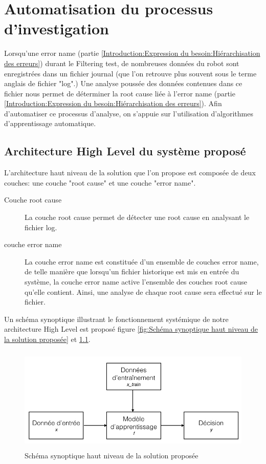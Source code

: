 \chapter{Automatisation du processus d'investigation}
\label{Automatisation du processus d'investigation}
\thispagestyle{fancy}
Lorsqu'une error name (partie \ref{Introduction:Expression du besoin:Hiérarchisation des erreurs}) durant le Filtering test, de nombreuses données du robot sont enregistrées dans un fichier journal (que l'on retrouve plus souvent sous le terme anglais de fichier "log".) Une analyse poussée des données contenues dans ce fichier nous permet de déterminer la root cause liée à l'error name (partie \ref{Introduction:Expression du besoin:Hiérarchisation des erreurs}). Afin d'automatiser ce processus d'analyse, on s'appuie sur l'utilisation d'algorithmes d'apprentissage automatique. 

\section{Architecture High Level du système proposé}
\label{Automatisation du processus d'investigation: Achitecture High Level du système proposé}
L'architecture haut niveau de la solution que l'on propose est composée de deux couches: une couche "root cause" et une couche "error name".
\begin{description}
	\item [Couche root cause] La couche root cause permet de détecter une root cause en analysant le fichier log.
	\item [couche error name] La couche error name est constituée d'un ensemble de couches error name, de telle manière que lorsqu'un fichier historique est mis en entrée du système, la couche error name active l'ensemble des couches root cause qu'elle contient. Ainsi, une analyse de chaque root cause sera effectué sur le fichier.
\end{description} 

Un schéma synoptique illustrant le fonctionnement systémique de notre architecture High Level est proposé figure \ref{fig:Schéma synoptique haut niveau de la solution proposée} et \ref{fig:Schéma synoptique haut niveau de la solution proposée: couche error name}.

\begin{figure}[h]
	\centering\includegraphics[height=5cm]{images/ML_high_level.jpeg}
	\caption{Schéma synoptique haut niveau de la solution proposée}
	\label{fig:Schéma synoptique haut niveau de la solution proposée: couche error name}
\end{figure}

